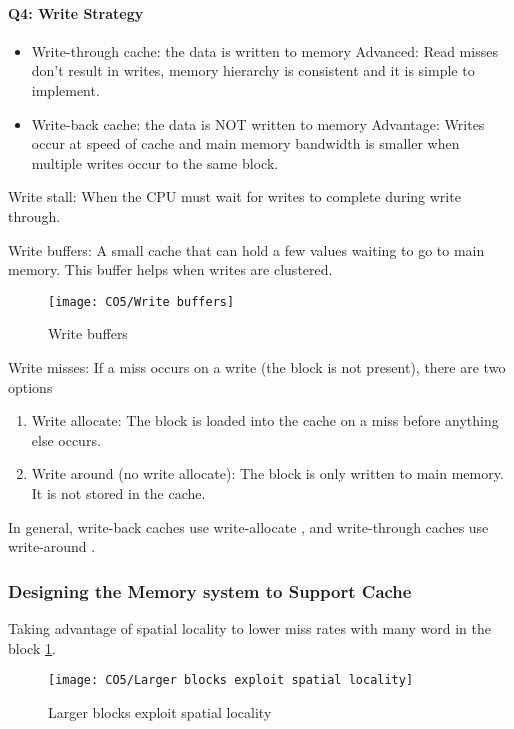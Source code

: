 \paragraph{Q4: Write Strategy}
\begin{itemize}
    \item Write-through cache: {\small the data is written to memory}
    \subitem Advanced: {\small Read misses don't result in writes, memory hierarchy is consistent and it is simple to implement.}
    \item Write-back cache: {\small the data is NOT written to memory}
    \subitem Advantage: {\small Writes occur at speed of cache and main memory bandwidth is smaller when multiple writes occur to the same block.}
\end{itemize}

Write stall: When the CPU must wait for writes to complete during write through. 

Write buffers: A small cache that can hold a few values waiting to go to main memory. This buffer helps when writes are clustered.

\begin{figure}[!htb]
    \centering
    \texttt{[image: CO5/Write buffers]}
    \caption{Write buffers}
\end{figure}

Write misses: If a miss occurs on a write (the block is not present), there are two options
\begin{enumerate}
    \item Write allocate: {\small The block is loaded into the cache on a miss before anything else occurs.}
    \item Write around (no write allocate): {\small The block is only written to main memory. It is not stored in the cache.}
\end{enumerate}
In general, write-back caches use write-allocate , and write-through caches use write-around .

\subsubsection{Designing the Memory system to Support Cache}
Taking advantage of spatial locality to lower miss rates with many word in the block \ref{Larger blocks exploit spatial locality}. 
\begin{figure}[!htb]
    \centering
    \texttt{[image: CO5/Larger blocks exploit spatial locality]}
    \caption{Larger blocks exploit spatial locality}
    \label{Larger blocks exploit spatial locality}
\end{figure}

